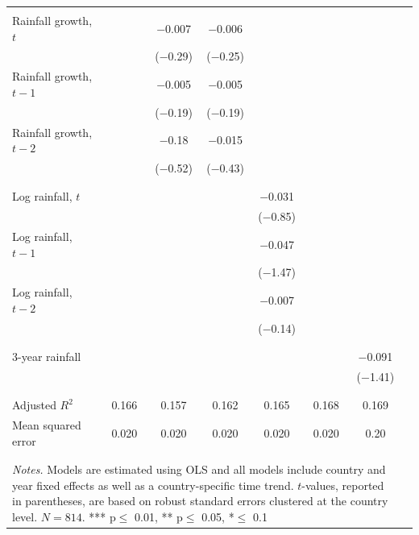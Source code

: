 \documentclass[a4paper,11pt]{article}
\begin{document}
\begin{table}[!h]
{\begin{tabular}{@{\extracolsep{6pt}}lccccccc}
\\[-1.8ex]\\
Rainfall growth, $t$          & ~           & $-$0.007  & $-$0.006     & ~          & ~       & ~\\
~                             & ~           & ($-$0.29) & ($-$0.25)    & ~          & ~       & ~\\
Rainfall growth, $t-1$        & ~           & $-$0.005  & $-$0.005     & ~          & ~       & ~\\
~                             & ~           & ($-$0.19) & ($-$0.19)    & ~          & ~       & ~\\
Rainfall growth, $t-2$        & ~           & $-$0.18   & $-$0.015     & ~          & ~       & ~\\
~                             & ~           & ($-$0.52) & ($-$0.43)    & ~          & ~       & ~\\
\\[-1.8ex]\\
Log rainfall, $t$             & ~           & ~         & ~            & $-$0.031   & ~       & ~\\
~                             & ~           & ~         & ~            & ($-$0.85)  & ~       & ~\\
Log rainfall, $t-1$           & ~           & ~         & ~            & $-$0.047   & ~       & ~\\
~                             & ~           & ~         & ~            & ($-$1.47)  & ~       & ~\\
Log rainfall, $t-2$           & ~           & ~         & ~            & $-$0.007   & ~       & ~\\
~                             & ~           & ~         & ~            & ($-$0.14)  & ~       & ~\\
\\[-1.8ex]\\            
3-year rainfall               & ~           & ~         & ~            & ~          & ~       & $-$0.091\\
~                             & ~           & ~         & ~            & ~          & ~       &($-$1.41)\\
\\[-1.8ex]\\      
Adjusted $R^2$                & 0.166       & 0.157     & 0.162        & 0.165      & 0.168   & 0.169\\
Mean squared error            & 0.020       & 0.020     & 0.020        & 0.020      & 0.020   & 0.20\\
\\[-1.8ex]\hline 
\hline \\[-1.8ex]
\multicolumn{7}{p{20cm}}{\textit{Notes.} Models are estimated using OLS and all models include country and year fixed effects as well as a country-specific time trend. $t$-values, reported in parentheses, are based on robust standard errors clustered at the country level. $N=814$. *** p$\leq$ 0.01, ** p$\leq$ 0.05, *$\leq$ 0.1}
    \end{tabular}}
\end{table}
\end{document}
